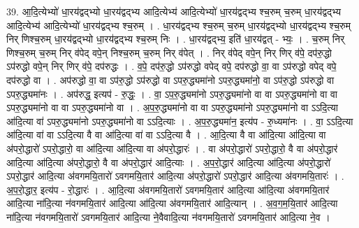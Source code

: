 \documentclass[17pt]{extarticle}
\begin{document}
39. आ॒दि॒त्येभ्यो॑ धा॒रय॑द्वद्भ्यो धा॒रय॑द्वद्भ्य आदि॒त्येभ्य॑ आदि॒त्येभ्यो॑ धा॒रय॑द्वद्भ्य श्च॒रुम् च॒रुम् धा॒रय॑द्वद्भ्य आदि॒त्येभ्य॑ आदि॒त्येभ्यो॑ धा॒रय॑द्वद्भ्य श्च॒रुम् । . धा॒रय॑द्वद्भ्य श्च॒रुम् च॒रुम् धा॒रय॑द्वद्भ्यो धा॒रय॑द्वद्भ्य श्च॒रुम् निर् णिश्च॒रुम् धा॒रय॑द्वद्भ्यो धा॒रय॑द्वद्भ्य श्च॒रुम् निः । . धा॒रय॑द्वद्भ्य॒ इति॑ धा॒रय॑द्वत् - भ्यः॒ । . च॒रुम् निर् णिश्च॒रुम् च॒रुम् निर् व॑पेद् वपे॒न् निश्च॒रुम् च॒रुम् निर् व॑पेत् । . निर् व॑पेद् वपे॒न् निर् णिर् व॑पे॒ दप॑रु॒द्धो ऽप॑रुद्धो वपे॒न् निर् णिर् व॑पे॒ दप॑रुद्धः । . व॒पे॒ दप॑रु॒द्धो ऽप॑रुद्धो वपेद् वपे॒ दप॑रुद्धो वा॒ वा ऽप॑रुद्धो वपेद् वपे॒ दप॑रुद्धो वा । . अप॑रुद्धो वा॒ वा ऽप॑रु॒द्धो ऽप॑रुद्धो वा ऽपरु॒द्ध्यमा॑नो ऽपरु॒द्ध्यमा॑नो॒ वा ऽप॑रु॒द्धो ऽप॑रुद्धो वा ऽपरु॒द्ध्यमा॑नः । . अप॑रुद्ध॒ इत्यप॑ - रु॒द्धः॒ । . वा॒ ऽप॒रु॒द्ध्यमा॑नो ऽपरु॒द्ध्यमा॑नो वा वा ऽपरु॒द्ध्यमा॑नो वा वा ऽपरु॒द्ध्यमा॑नो वा वा ऽपरु॒द्ध्यमा॑नो वा । . अ॒प॒रु॒द्ध्यमा॑नो वा वा ऽपरु॒द्ध्यमा॑नो ऽपरु॒द्ध्यमा॑नो वा ऽऽदि॒त्या आ॑दि॒त्या वा॑ ऽपरु॒द्ध्यमा॑नो ऽपरु॒द्ध्यमा॑नो वा ऽऽदि॒त्याः । . अ॒प॒रु॒द्ध्यमा॑न॒ इत्य॑प - रु॒ध्यमा॑नः । . वा॒ ऽऽदि॒त्या आ॑दि॒त्या वा॑ वा ऽऽदि॒त्या वै वा आ॑दि॒त्या वा॑ वा ऽऽदि॒त्या वै । . आ॒दि॒त्या वै वा आ॑दि॒त्या आ॑दि॒त्या वा अ॑परो॒द्धारो॑ ऽपरो॒द्धारो॒ वा आ॑दि॒त्या आ॑दि॒त्या वा अ॑परो॒द्धारः॑ । . वा अ॑परो॒द्धारो॑ ऽपरो॒द्धारो॒ वै वा अ॑परो॒द्धार॑ आदि॒त्या आ॑दि॒त्या अ॑परो॒द्धारो॒ वै वा अ॑परो॒द्धार॑ आदि॒त्याः । . अ॒प॒रो॒द्धार॑ आदि॒त्या आ॑दि॒त्या अ॑परो॒द्धारो॑ ऽपरो॒द्धार॑ आदि॒त्या अ॑वगमयि॒तारो॑ ऽवगमयि॒तार॑ आदि॒त्या अ॑परो॒द्धारो॑ ऽपरो॒द्धार॑ आदि॒त्या अ॑वगमयि॒तारः॑ । . अ॒प॒रो॒द्धार॒ इत्य॑प - रो॒द्धारः॑ । . आ॒दि॒त्या अ॑वगमयि॒तारो॑ ऽवगमयि॒तार॑ आदि॒त्या आ॑दि॒त्या अ॑वगमयि॒तार॑ आदि॒त्या ना॑दि॒त्या न॑वगमयि॒तार॑ आदि॒त्या आ॑दि॒त्या अ॑वगमयि॒तार॑ आदि॒त्यान् । . अ॒व॒ग॒म॒यि॒तार॑ आदि॒त्या ना॑दि॒त्या न॑वगमयि॒तारो॑ ऽवगमयि॒तार॑ आदि॒त्या ने॒वैवादि॒त्या न॑वगमयि॒तारो॑ ऽवगमयि॒तार॑ आदि॒त्या ने॒व । \newline
\end{document}
